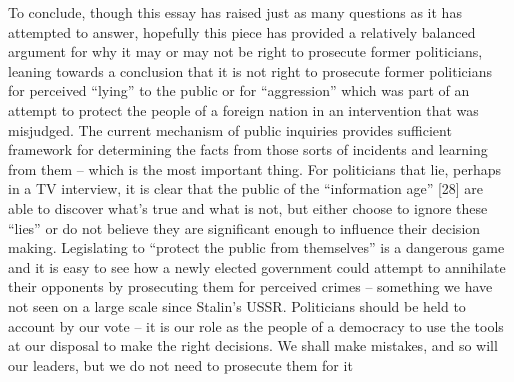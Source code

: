 To conclude, though this essay has raised just as many questions as it has attempted to answer, hopefully this piece has provided a relatively balanced argument for why it may or may not be right to prosecute former politicians, leaning towards a conclusion that it is not right to prosecute former politicians for perceived “lying” to the public or for “aggression” which was part of an attempt to protect the people of a foreign nation in an intervention that was misjudged. The current mechanism of public inquiries provides sufficient framework for determining the facts from those sorts of incidents and learning from them – which is the most important thing. For politicians that lie, perhaps in a TV interview, it is clear that the public of the “information age” [28] are able to discover what’s true and what is not, but either choose to ignore these “lies” or do not believe they are significant enough to influence their decision making. Legislating to “protect the public from themselves” is a dangerous game and it is easy to see how a newly elected government could attempt to annihilate their opponents by prosecuting them for perceived crimes – something we have not seen on a large scale since Stalin’s USSR. Politicians should be held to account by our vote – it is our role as the people of a democracy to use the tools at our disposal to make the right decisions. We shall make mistakes, and so will our leaders, but we do not need to prosecute them for it

